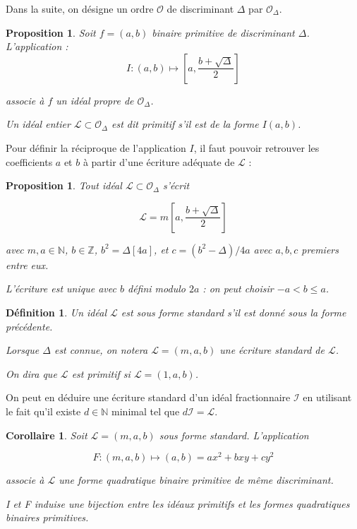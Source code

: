 \documentclass{article}
\newcommand{\N}[0]{\mathbb{N}}
\newcommand{\Z}[0]{\mathbb{Z}}
\newcommand{\OR}[0]{\mathcal{O}}
\newcommand{\LR}[0]{\mathcal{L}}
\newcommand{\IR}[0]{\mathcal{I}}
\newtheorem{Prop}[The]{Proposition}
\newtheorem{Def}[The]{Définition}
\newtheorem{Coro}[The]{Corollaire}
\begin{document}
Dans la suite, on désigne un ordre $\OR$ de discriminant $\Delta$ par $\OR_{\Delta}$.

\begin{Prop}
	
	Soit $f = (a,b)$ binaire primitive de discriminant $\Delta$. L'application :
	\begin{equation*}
		I : (a,b)\mapsto\left[ a, \frac{b + \sqrt{\Delta}}{2}\right] 
	\end{equation*}
	
	associe à $f$ un idéal propre de $\OR_{\Delta}$.
	
	Un idéal entier $\LR\subset\OR_{\Delta}$ est dit primitif s'il est de la forme $I(a,b)$. 
	
\end{Prop}

Pour définir la réciproque de l'application $I$, il faut pouvoir retrouver les coefficients $a$ et $b$ à partir d'une écriture adéquate de $\LR$ :

\begin{Prop}
	
	Tout idéal $\LR\subset\OR_{\Delta}$ s'écrit 
	
	\begin{equation*}
		\LR = m\left[ a , \frac{b + \sqrt{\Delta}}{2}\right] 
	\end{equation*}
	
	avec $m,a \in\N$, $b\in\Z$, $b^{2} = \Delta [4a]$, et $c = (b^2 -\Delta)/4a$ avec $a, b, c$ premiers entre eux.
	
	L'écriture est unique avec $b$ défini modulo $2a$ : on peut choisir $-a<b\leq a$.
	
\end{Prop}

\begin{Def}
	Un idéal $\LR$ est sous forme standard s'il est donné sous la forme précédente. 
	
	Lorsque $\Delta$ est connue, on notera $\LR = (m,a,b)$ une écriture standard de $\LR$. 
	
	On dira que $\LR$ est primitif si $\LR = (1,a,b)$.
	
\end{Def}

On peut en déduire une écriture standard d'un idéal fractionnaire $\IR$ en utilisant le fait qu'il existe $d\in\N$ minimal tel que $d\IR = \LR$. 

\begin{Coro}
	Soit $\LR = (m,a,b)$ sous forme standard. L'application
	
	\begin{equation*}
		F : (m,a,b)\mapsto (a,b) = ax^2 + bxy + cy^2
	\end{equation*}
	
	associe à $\LR$ une forme quadratique binaire primitive de même discriminant. 
	
	I et F induise une bijection entre les idéaux primitifs et les formes quadratiques binaires primitives.
	
\end{Coro}
\end{document}
